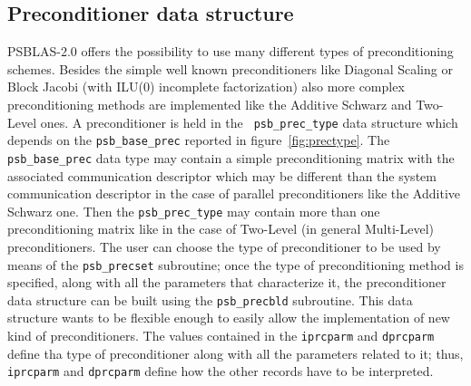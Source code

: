 \subsection{Preconditioner data structure}
\label{sec:prec}
PSBLAS-2.0 offers the possibility to use many different types of
preconditioning schemes. Besides the simple well known preconditioners
like Diagonal Scaling or Block Jacobi (with ILU(0) incomplete
factorization) also more complex preconditioning methods are
implemented like the Additive Schwarz and Two-Level ones. A
preconditioner is held in the \hypertarget{precdata}{{\tt
    psb\_prec\_type}} data structure which depends on the
\verb|psb_base_prec| reported in 
figure~\ref{fig:prectype}. The \verb|psb_base_prec| 
data type may contain a simple preconditioning matrix with the
associated communication descriptor which may be different than the
system communication descriptor in the case of parallel
preconditioners like the Additive Schwarz one. Then the
\verb|psb_prec_type| may contain more than one preconditioning matrix
like in the case of Two-Level (in general Multi-Level) preconditioners.
The user can choose the type of preconditioner to be used by means of
the \verb|psb_precset| subroutine; once the type of preconditioning
method is specified, along with all the parameters that characterize
it, the preconditioner data structure can be built using the
\verb|psb_precbld| subroutine.
This data structure wants to be flexible enough to easily allow the
implementation of new kind of preconditioners. The values contained in
the \verb|iprcparm| and \verb|dprcparm| define tha type of
preconditioner along with all the parameters related to it; thus,
\verb|iprcparm| and \verb|dprcparm| define how the other records have
to be interpreted.
